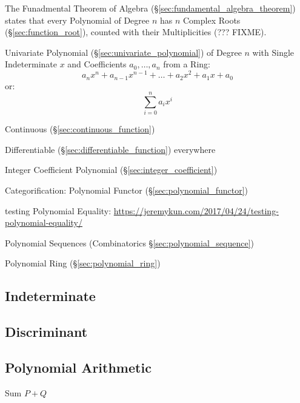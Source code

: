 The Funadmental Theorem of Algebra (\S\ref{sec:fundamental_algebra_theorem})
states that every Polynomial of Degree $n$ has $n$ Complex Roots
(\S\ref{sec:function_root}), counted with their Multiplicities (??? FIXME).

Univariate Polynomial (\S\ref{sec:univariate_polynomial}) of Degree
$n$ with Single Indeterminate $x$ and Coefficients $a_0, \ldots, a_n$
from a Ring:
\[
  a_n x^n + a_{n-1} x^{n-1} + \ldots + a_2 x^2 + a_1 x + a_0
\]
or:
\[
  \sum_{i=0}^n a_i x^i
\]

Continuous (\S\ref{sec:continuous_function})

Differentiable (\S\ref{sec:differentiable_function}) everywhere

Integer Coefficient Polynomial (\S\ref{sec:integer_coefficient})

Categorification: Polynomial Functor (\S\ref{sec:polynomial_functor})

testing Polynomial Equality:
\url{https://jeremykun.com/2017/04/24/testing-polynomial-equality/}

\fist Polynomial Sequences (Combinatorics \S\ref{sec:polynomial_sequence})

\fist Polynomial Ring (\S\ref{sec:polynomial_ring})



\subsection{Indeterminate}\label{sec:indeterminate}

\subsection{Discriminant}\label{sec:discriminant}

\subsection{Polynomial Arithmetic}\label{sec:polynomial_arithmetic}

Sum $P + Q$

